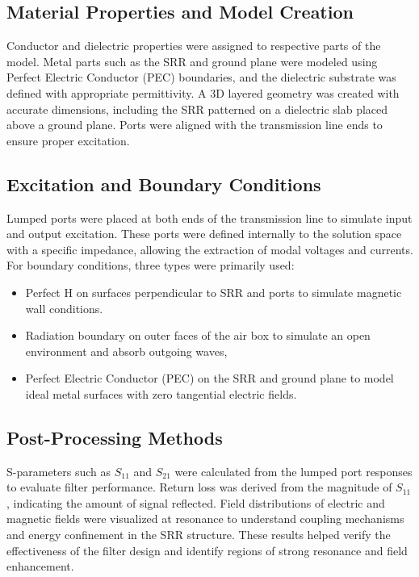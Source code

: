 \documentclass[conference]{IEEEtran}
\begin{document}
\subsection{Material Properties and Model Creation}
Conductor and dielectric properties were assigned to respective parts of the model. Metal parts such as the SRR and ground plane were modeled using Perfect Electric Conductor (PEC) boundaries, and the dielectric substrate was defined with appropriate permittivity. A 3D layered geometry was created with accurate dimensions, including the SRR patterned on a dielectric slab placed above a ground plane. Ports were aligned with the transmission line ends to ensure proper excitation.

\subsection{Excitation and Boundary Conditions}
Lumped ports were placed at both ends of the transmission line to simulate input and output excitation. These ports were defined internally to the solution space with a specific impedance, allowing the extraction of modal voltages and currents. For boundary conditions, three types were primarily used:
\begin{itemize}
    \item Perfect H on surfaces perpendicular to SRR and ports to simulate magnetic wall conditions.
    \item Radiation boundary on outer faces of the air box to simulate an open environment and absorb outgoing waves,
    \item Perfect Electric Conductor (PEC) on the SRR and ground plane to model ideal metal surfaces with zero tangential electric fields.
\end{itemize}

\subsection{Post-Processing Methods}
S-parameters such as \( S_{11} \) and \( S_{21} \) were calculated from the lumped port responses to evaluate filter performance. Return loss was derived from the magnitude of \( S_{11} \), indicating the amount of signal reflected. Field distributions of electric and magnetic fields were visualized at resonance to understand coupling mechanisms and energy confinement in the SRR structure. These results helped verify the effectiveness of the filter design and identify regions of strong resonance and field enhancement.
\end{document}
